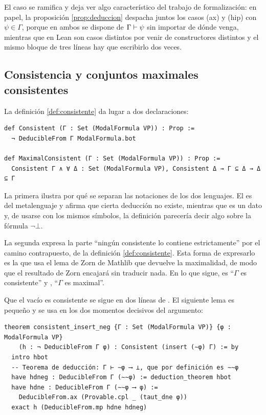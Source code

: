 El caso  se ramifica y deja ver algo característico del trabajo de formalización: en papel, la proposición \ref{prop:deduccion} despacha juntos los casos (ax) y (hip) con $\psi \in \Gamma$, porque en ambos se dispone de $\Gamma \vdash \psi$ sin importar de dónde venga, mientras que en Lean son casos distintos por venir de constructores distintos y el mismo bloque de tres líneas hay que escribirlo dos veces.

\subsection{Consistencia y conjuntos maximales consistentes}\label{subsec:comp-cons}

La definición \ref{def:consistente} da lugar a dos declaraciones:

\begin{lstlisting}
def Consistent (Γ : Set (ModalFormula VP)) : Prop :=
  ¬ DeducibleFrom Γ ModalFormula.bot

def MaximalConsistent (Γ : Set (ModalFormula VP)) : Prop :=
  Consistent Γ ∧ ∀ Δ : Set (ModalFormula VP), Consistent Δ → Γ ⊆ Δ → Δ ⊆ Γ
\end{lstlisting}

La primera ilustra por qué se separan las notaciones de los dos lenguajes. El  es del metalenguaje y afirma que cierta deducción no existe, mientras que  es un dato y, de usarse con los mismos símbolos, la definición parecería decir algo sobre la fórmula $\lnot\bot$.

La segunda expresa la parte ``ningún consistente lo contiene estrictamente'' por el camino contrapuesto, de la definición \ref{def:consistente}. Esta forma de expresarlo es la que usa el lema de Zorn de Mathlib que devuelve la maximalidad, de modo que el resultado de Zorn encajará sin traducir nada. En lo que sigue,  es ``$\Gamma$ es consistente'' y , ``$\Gamma$ es maximal''.

Que el vacío es consistente se sigue en dos líneas de . El siguiente lema es pequeño y se usa en los dos momentos decisivos del argumento:

\begin{lstlisting}
theorem consistent_insert_neg {Γ : Set (ModalFormula VP)} {φ : ModalFormula VP}
    (h : ¬ DeducibleFrom Γ φ) : Consistent (insert (∼φ) Γ) := by
  intro hbot
  -- Teorema de deducción: Γ ⊢ ∼φ ⟶ ⊥, que por definición es ∼∼φ
  have hdneg : DeducibleFrom Γ (∼∼φ) := deduction_theorem hbot
  have hdne : DeducibleFrom Γ (∼∼φ ⟶ φ) :=
    DeducibleFrom.ax (Provable.cpl _ (taut_dne φ))
  exact h (DeducibleFrom.mp hdne hdneg)
\end{lstlisting}

